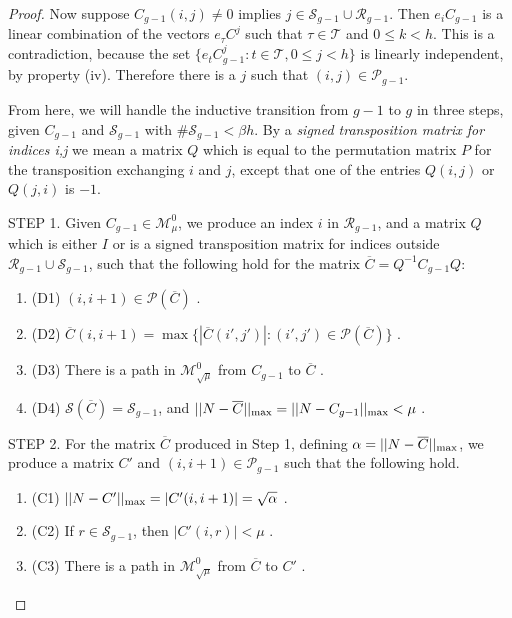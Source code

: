 \documentclass{amsart}
\theoremstyle{definition}
\theoremstyle{remark}
\numberwithin{equation}{section}
\begin{document}
{{\begin{proof}
Now suppose  $C_{g-1}(i,j)\neq 0$ implies 
$j\in \mathcal S_{g-1} \cup 
\mathcal R_{g-1}$. 
Then $e_iC_{g-1}$ is 
a linear combination of the vectors 
$e_{\tau}C^j$ such that $\tau\in \mathcal T$ 
and $0\leq k< h$. This is a contradiction, 
because the set 
 $\{e_tC_{g-1}^j: t\in \mathcal T, 0\leq j < h\}$ 
is linearly independent, by property (iv).
 Therefore there is a $j$ 
such that $(i,j)\in \mathcal P_{g-1}$. 


From here, we will handle the inductive transition from $g-1$ to $g$
in three steps,  given $C_{g-1}$ and $\mathcal S_{g-1}$ with 
$\#\mathcal S_{g-1} < \beta h$.  By a {\it signed transposition 
matrix for indices i,j } we mean a matrix $Q$ which is equal 
to the permutation matrix $P$ for the transposition 
exchanging 
$i$ and $j$, except that one of the entries 
$Q(i,j)$ or $Q(j,i)$ is $-1$. 

STEP 1. 
Given $C_{g-1}\in \mathcal M^0_{\mu}$, 
we produce 
 an index $i$ in $\mathcal R_{g-1}$, and a matrix $Q$ 
which is either $I$ or is 
 a signed transposition matrix 
for indices outside $\mathcal R_{g-1}  \cup \mathcal S_{g-1}$, 
 such that  the following hold
for the matrix $\overline C= Q^{-1}C_{g-1}Q$: 
\begin{enumerate} 
\item[] (D1)
$(i,i+1)\in \mathcal P(\overline C)$ .  
\item[] (D2)
$\overline C(i,i+1)= \max \{|\overline C(i',j')|: (i',j')
\in \mathcal P(\overline C)\}$   . 
\item[] (D3) 
There is  a path in  
$\mathcal M^0_{\sqrt{\mu}}$ from
$C_{g-1}$ to $\overline C$ .
\item[] (D4) 
$\mathcal S(\overline C) = \mathcal S_{g-1}$, and 
$||N-\overline C||_{\textnormal{max}}= 
||N-C_{g-1}||_{\textnormal{max}} < \mu $ .  
\end{enumerate} 






STEP 2. 
For the matrix $\overline C$ produced in Step 1, 
defining $ \alpha=||N-\overline C||_{\textnormal{max}}$,  
we produce a matrix $C'$ and $(i,i+1)\in \mathcal P_{g-1}$ 
 such that the following 
hold. 
\begin{enumerate} 
\item[] (C1) 
$||N-C'||_{\textnormal{max}}= |C'(i,i+1)| =
\sqrt{\alpha } $ .
\item[] (C2)
If $r\in \mathcal S_{g-1}$, then $|C'(i,r)|<\mu$ . 
\item[] (C3) 
There is a path in $\mathcal M^0_{\sqrt{\mu}}$ from $\overline C$ to $C'$ . 
\end{enumerate} 


\end{proof}}}
\end{document}
